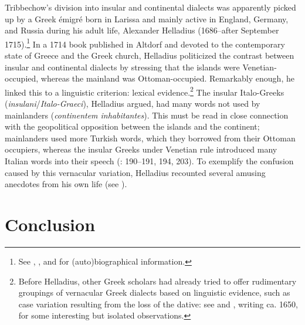 Tribbechow’s division into insular and continental dialects was apparently picked up by a Greek émigré born in Larissa and mainly active in England, Germany, and Russia during his adult life, Alexander Helladius (1686–after September 1715).\footnote{See \citet{Helladius1714}, \citet[315--317]{Moennig1998}, and \citet{VanRooyFca} for (auto)biographical information.} In a 1714 book published in Altdorf and devoted to the contemporary state of Greece and the Greek church, Helladius politicized the contrast between insular and continental dialects by stressing that the islands were Venetian-oc\-cu\-pied, whereas the mainland was Ottoman-occupied. Remarkably enough, he linked this to a linguistic criterion: lexical evidence.\footnote{Before Helladius, other Greek scholars had already tried to offer rudimentary groupings of vernacular Greek dialects based on linguistic evidence, such as case variation resulting from the loss of the dative: see \citet[108]{Kritopoulos1924} and \citet[e.g. 1 \& 8]{Nikiforos1908}, writing ca. 1650, for some interesting but isolated observations.} The insular Italo-Greeks (\textit{insulani}/\textit{Italo-Graeci}), Helladius argued, had many words not used by mainlanders (\textit{continentem inhabitantes}). This must be read in close connection with the geopolitical opposition between the islands and the continent; mainlanders used more Turkish words, which they borrowed from their Ottoman occupiers, whereas the insular Greeks under Venetian rule introduced many Italian words into their speech (\citealt{Helladius1714}: 190–191, 194, 203). To exemplify the confusion caused by this vernacular variation, Helladius recounted several amusing anecdotes from his own life (see \citet{VanRooyFca}).

\section{Conclusion}\label{sec:2.11}

